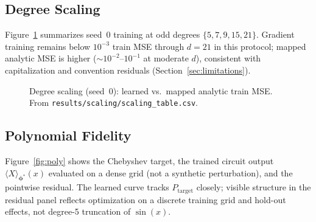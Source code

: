 \documentclass[11pt,a4paper]{article}
\begin{document}
\subsection{Degree Scaling}

Figure~\ref{fig:scaling} summarizes seed~0 training at odd degrees $\{5,7,9,15,21\}$. Gradient training remains below $10^{-3}$ train MSE through $d=21$ in this protocol; mapped analytic MSE is higher ($\sim10^{-2}$--$10^{-1}$ at moderate $d$), consistent with capitalization and convention residuals (Section~\ref{sec:limitations}).

\begin{figure}[ht]
\centering
{}
\caption{Degree scaling (seed~0): learned vs.\ mapped analytic train MSE. From \texttt{results/scaling/scaling\_table.csv}.}
\label{fig:scaling}
\end{figure}

\subsection{Polynomial Fidelity}

Figure~\ref{fig:poly} shows the Chebyshev target, the trained circuit output $\langle X\rangle_{\boldsymbol{\phi}^*}(x)$ evaluated on a dense grid (not a synthetic perturbation), and the pointwise residual. The learned curve tracks $P_{\mathrm{target}}$ closely; visible structure in the residual panel reflects optimization on a discrete training grid and hold-out effects, not degree-5 truncation of $\sin(x)$.
\end{document}
